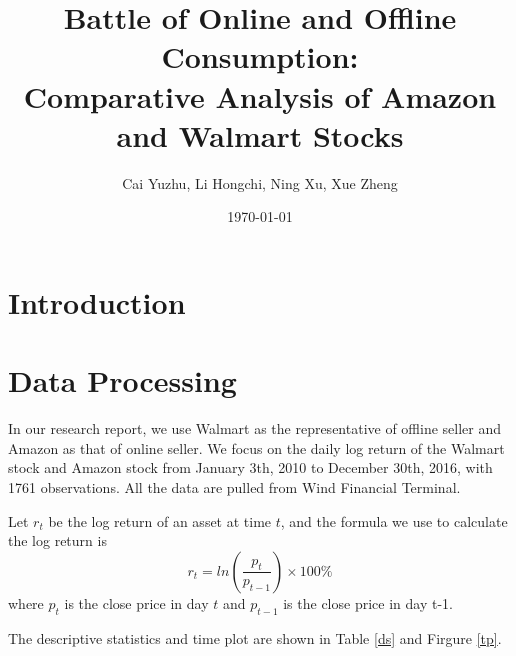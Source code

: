 \documentclass[paper=a4, fontsize=13pt]{article}
\title{
\normalfont \normalsize
\huge Battle of Online and Offline Consumption: \\
Comparative Analysis of Amazon and Walmart Stocks
}
\author{Cai Yuzhu, Li Hongchi, Ning Xu, Xue Zheng}
\date{\normalsize\today}
\begin{document}
\maketitle
\section{Introduction}

\section{Data Processing}
In our research report, we use Walmart as the representative of offline seller and Amazon as that of online seller. We focus on the daily log return of the Walmart stock and Amazon stock from January 3th, 2010 to December 30th, 2016, with 1761 observations. All the data are pulled from Wind Financial Terminal.

Let $r_t$ be the log return of an asset at time $t$, and the formula we use to calculate the log return is
\[ r_t = ln(\frac{p_t}{p_{t-1}}) \times 100\% \]
where $p_t$ is the close price in day $t$ and $p_{t-1}$ is the close price in day {t-1}.

The descriptive statistics and time plot are shown in Table \ref{ds} and Firgure \ref{tp}.

\begin{table}[!htbp]
\caption{Descriptive Statistics}  
\centering  
{}  
\qquad  
{}
\label{ds} 
\end{table}  
\end{document}
